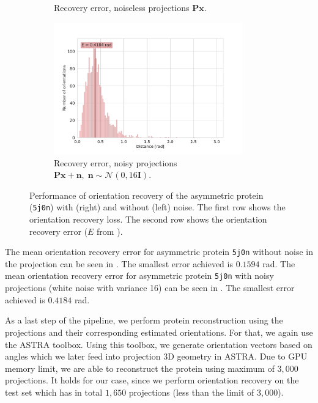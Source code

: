 \begin{figure}[ht!]
\begin{subfigure}[b]{0.45\textwidth}
        \caption{Recovery error, noiseless projections $\mathbf{Px}$.}
        \label{fig:angle-alignment-5j0n-noise0}
    \end{subfigure}
    \hfill
    \begin{subfigure}[b]{0.5\textwidth}
    \centering
        \includegraphics[height=5.7cm]{figures/5j0n_noise16_angle_alignment_after}
        \caption{Recovery error, noisy projections $\mathbf{Px+n}, \; \mathbf{n} \sim \mathcal{N}(0, 16\mathbf{I})$.}
        \label{fig:angle-alignment-5j0n-noise16}
    \end{subfigure}
    \caption{%
        Performance of orientation recovery of the asymmetric protein (\texttt{5j0n}) with (right) and without (left) noise.
        The first row shows the orientation recovery loss.
        The second row shows the orientation recovery error ($E$ from ).
    }\label{fig:5j0n-orientation-recovery-loss-est}
\end{figure}

The mean orientation recovery error for asymmetric protein \texttt{5j0n} without noise in the projection can be seen in .
The smallest error achieved is $0.1594$ rad.
The mean orientation recovery error for asymmetric protein \texttt{5j0n} with noisy projections (white noise with variance 16) can be seen in .
The smallest error achieved is $0.4184$ rad.

As a last step of the pipeline, we perform protein reconstruction using the projections and their corresponding estimated orientations.
For that, we again use the ASTRA toolbox.
Using this toolbox, we generate orientation vectors based on angles which we later feed into projection 3D geometry in ASTRA.
Due to GPU memory limit, we are able to reconstruct the protein using maximum of $3,000$ projections.
It holds for our case, since we perform orientation recovery on the test set which has in total $1,650$ projections (less than the limit of $3,000$).

